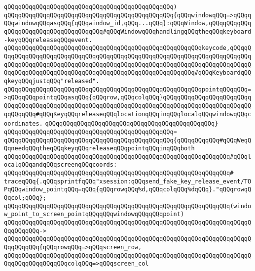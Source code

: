 \verb|qQQqqQQqqQQqqQQqqQQqqQQqqQQqqQQqqQQqqQQqqQQqqQQq)|\newline
\verb|qQQqqQQqqQQqqQQqqQQqqQQqqQQqqQQqqQQqqQQqqQQqqQQq{qQQqwindowqQQq=>qQQqqQQqwindowqQQqasqQQq{qQQqwindow_id,qQQq...qQQq}:qQQqWindow,qQQqqQQqqQQqqQQqqQQqqQQqqQQqqQQqqQQqqQQq#qQQqWindowqQQqhandlingqQQqtheqQQqkeyboard-keyqQQqreleaseqQQqevent.|\newline
\verb|qQQqqQQqqQQqqQQqqQQqqQQqqQQqqQQqqQQqqQQqqQQqqQQqqQQqqQQqkeycode,qQQqqQQqqQQqqQQqqQQqqQQqqQQqqQQqqQQqqQQqqQQqqQQqqQQqqQQqqQQqqQQqqQQqqQQqqQQqqQQqqQQqqQQqqQQqqQQqqQQqqQQqqQQqqQQqqQQqqQQqqQQqqQQqqQQqqQQqqQQqqQQqqQQqqQQqqQQqqQQqqQQqqQQqqQQqqQQqqQQqqQQqqQQqqQQqqQQqqQQq#qQQqKeyboardqQQqkeyqQQqjustqQQq"released".|\newline
\verb|qQQqqQQqqQQqqQQqqQQqqQQqqQQqqQQqqQQqqQQqqQQqqQQqqQQqqQQqpointqQQqqQQq=>qQQqqQQqpointqQQqasqQQq{qQQqrow,qQQqcolqQQq}qQQqqQQqqQQqqQQqqQQqqQQqqQQqqQQqqQQqqQQqqQQqqQQqqQQqqQQqqQQqqQQqqQQqqQQqqQQqqQQqqQQqqQQqqQQqqQQqqQQqqQQq#qQQqKeyqQQqreleaseqQQqlocationqQQqinqQQqlocalqQQqwindowqQQqcoordinates.|\newline
\verb|qQQqqQQqqQQqqQQqqQQqqQQqqQQqqQQqqQQqqQQqqQQqqQQq}|\newline
\verb|qQQqqQQqqQQqqQQqqQQqqQQqqQQqqQQqqQQqqQQqqQQqqQQq=|\newline
\verb|qQQqqQQqqQQqqQQqqQQqqQQqqQQqqQQqqQQqqQQqqQQqqQQq{qQQqqQQqqQQq#qQQqWeqQQqneedqQQqtheqQQqkeyqQQqreleaseqQQqpointqQQqinqQQqboth|\newline
\verb|qQQqqQQqqQQqqQQqqQQqqQQqqQQqqQQqqQQqqQQqqQQqqQQqqQQqqQQqqQQqqQQq#qQQqlocalqQQqandqQQqscreenqQQqcoords:|\newline
\verb|qQQqqQQqqQQqqQQqqQQqqQQqqQQqqQQqqQQqqQQqqQQqqQQqqQQqqQQqqQQqqQQq#|\newline
\verb|traceqQQq{.qQQqsprintfqQQq"xsession:qQQqsend_fake_key_release_event/TOPqQQqwindow_pointqQQq=qQQq{qQQqrowqQQq%d,qQQqcolqQQq%dqQQq}."qQQqrowqQQqcol;qQQq};|\newline
\verb|qQQqqQQqqQQqqQQqqQQqqQQqqQQqqQQqqQQqqQQqqQQqqQQqqQQqqQQqqQQqqQQq(window_point_to_screen_pointqQQqqQQqwindowqQQqqQQqpoint)|\newline
\verb|qQQqqQQqqQQqqQQqqQQqqQQqqQQqqQQqqQQqqQQqqQQqqQQqqQQqqQQqqQQqqQQqqQQqqQQqqQQqqQQq->|\newline
\verb|qQQqqQQqqQQqqQQqqQQqqQQqqQQqqQQqqQQqqQQqqQQqqQQqqQQqqQQqqQQqqQQqqQQqqQQqqQQqqQQq{qQQqrowqQQq=>qQQqscreen_row,|\newline
\verb|qQQqqQQqqQQqqQQqqQQqqQQqqQQqqQQqqQQqqQQqqQQqqQQqqQQqqQQqqQQqqQQqqQQqqQQqqQQqqQQqqQQqqQQqcolqQQq=>qQQqscreen_col|\newline
